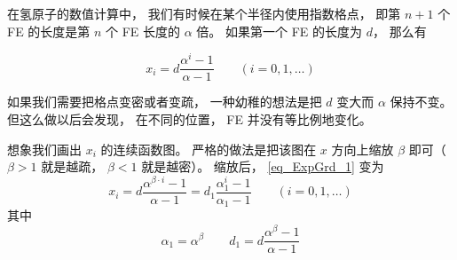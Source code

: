 

在氢原子的数值计算中， 我们有时候在某个半径内使用指数格点， 即第 $n+1$ 个 FE 的长度是第 $n$ 个 FE 长度的 $\alpha$ 倍。 如果第一个 FE 的长度为 $d$， 那么有

\begin{equation}\label{eq_ExpGrd_1}
x_i = d \frac{\alpha^i - 1}{\alpha - 1}
\qquad (i = 0, 1, \dots)
\end{equation}

如果我们需要把格点变密或者变疏， 一种幼稚的想法是把 $d$ 变大而 $\alpha$ 保持不变。 但这么做以后会发现， 在不同的位置， FE 并没有等比例地变化。

想象我们画出 $x_i$ 的连续函数图。 严格的做法是把该图在 $x$ 方向上缩放 $\beta$ 即可（$\beta > 1$ 就是越疏， $\beta < 1$ 就是越密）。 缩放后， \autoref{eq_ExpGrd_1} 变为
\begin{equation}
x_i = d \frac{\alpha^{\beta \cdot i} - 1}{\alpha - 1}
= d_1 \frac{\alpha_1^i - 1}{\alpha_1 - 1}
\qquad (i = 0, 1, \dots)
\end{equation}
其中
\begin{equation}
\alpha_1 = \alpha^\beta
\qquad
d_1 = d \frac{{\alpha^\beta - 1}}{\alpha - 1}
\end{equation}
